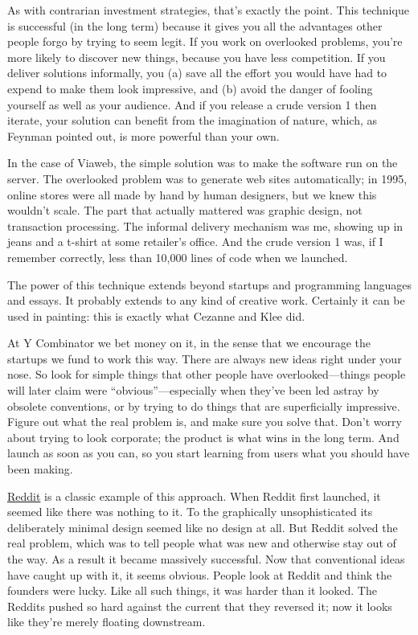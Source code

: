 \documentclass[12pt]{book}
\begin{document}
As with contrarian investment strategies, that's exactly the point. This
technique is successful (in the long term) because it gives you all the
advantages other people forgo by trying to seem legit. If you work on
overlooked problems, you're more likely to discover new things, because
you have less competition. If you deliver solutions informally, you (a)
save all the effort you would have had to expend to make them look
impressive, and (b) avoid the danger of fooling yourself as well as your
audience. And if you release a crude version 1 then iterate, your
solution can benefit from the imagination of nature, which, as Feynman
pointed out, is more powerful than your own.

In the case of Viaweb, the simple solution was to make the software run
on the server. The overlooked problem was to generate web sites
automatically; in 1995, online stores were all made by hand by human
designers, but we knew this wouldn't scale. The part that actually
mattered was graphic design, not transaction processing. The informal
delivery mechanism was me, showing up in jeans and a t-shirt at some
retailer's office. And the crude version 1 was, if I remember correctly,
less than 10,000 lines of code when we launched.

The power of this technique extends beyond startups and programming
languages and essays. It probably extends to any kind of creative work.
Certainly it can be used in painting: this is exactly what Cezanne and
Klee did.

At Y Combinator we bet money on it, in the sense that we encourage the
startups we fund to work this way. There are always new ideas right
under your nose. So look for simple things that other people have
overlooked---things people will later claim were
``obvious''---especially when they've been led astray by obsolete
conventions, or by trying to do things that are superficially
impressive. Figure out what the real problem is, and make sure you solve
that. Don't worry about trying to look corporate; the product is what
wins in the long term. And launch as soon as you can, so you start
learning from users what you should have been making.

\href{http://reddit.com}{Reddit} is a classic example of this approach.
When Reddit first launched, it seemed like there was nothing to it. To
the graphically unsophisticated its deliberately minimal design seemed
like no design at all. But Reddit solved the real problem, which was to
tell people what was new and otherwise stay out of the way. As a result
it became massively successful. Now that conventional ideas have caught
up with it, it seems obvious. People look at Reddit and think the
founders were lucky. Like all such things, it was harder than it looked.
The Reddits pushed so hard against the current that they reversed it;
now it looks like they're merely floating downstream.
\end{document}
